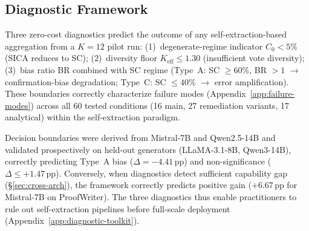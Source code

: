 \subsection{Diagnostic Framework}
\label{sec:diagnostic-framework}
\label{sec:diagnostics}

 Three zero-cost diagnostics predict the outcome of any self-extraction-based aggregation from a $K{=}12$ pilot run: (1)~degenerate-regime indicator $C_0 < 5\%$ (SICA reduces to SC); (2)~diversity floor $K_\text{eff} \leq 1.30$ (insufficient vote diversity); (3)~bias ratio BR combined with SC regime (Type~A: SC $\geq 60\%$, BR $> 1$ $\to$ confirmation-bias degradation; Type~C: SC $\leq 40\%$ $\to$ error amplification). These boundaries correctly characterize failure modes (Appendix~\ref{app:failure-modes}) across all 60 tested conditions (16 main, 27 remediation variants, 17 analytical) within the self-extraction paradigm.

 Decision boundaries were derived from Mistral-7B and Qwen2.5-14B and validated prospectively on held-out generators (LLaMA-3.1-8B, Qwen3-14B), correctly predicting Type~A bias ($\Delta = -4.41$\,pp) and non-significance ($\Delta \leq +1.47$\,pp). Conversely, when diagnostics detect sufficient capability gap (\S\ref{sec:cross-arch}), the framework correctly predicts positive gain ($+6.67$\,pp for Mistral-7B on ProofWriter). The three diagnostics thus enable practitioners to rule out self-extraction pipelines before full-scale deployment (Appendix~\ref{app:diagnostic-toolkit}).